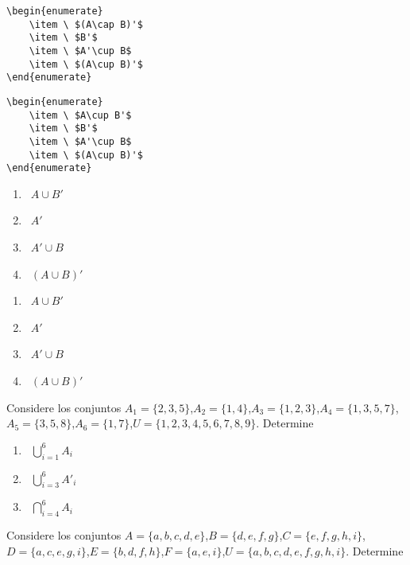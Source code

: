 \documentclass[]{book}
\theoremstyle{definition}
\theoremstyle{definition}
\theoremstyle{definition}
\theoremstyle{remark}
\begin{document}
\begin{verbatim}
\begin{enumerate}
	\item \ $(A\cap B)'$
	\item \ $B'$
	\item \ $A'\cup B$
	\item \ $(A\cup B)'$
\end{enumerate}
\end{verbatim}

\begin{verbatim}
\begin{enumerate}
	\item \ $A\cup B'$
	\item \ $B'$
	\item \ $A'\cup B$
	\item \ $(A\cup B)'$
\end{enumerate}
\end{verbatim}

\begin{enumerate}
	\item \ $A\cup B'$
	\item \ $A'$
	\item \ $A'\cup B$
	\item \ $(A\cup B)'$
\end{enumerate}

\begin{enumerate}
	\item \ $A\cup B'$
	\item \ $A'$
	\item \ $A'\cup B$
	\item \ $(A\cup B)'$
\end{enumerate}

Considere los conjuntos \(A_{1}=\{2,3,5\}\),\(A_{2}=\{1,4\}\),\(A_{3}=\{1,2,3\}\),\(A_{4}=\{1,3,5,7\}\),\(A_{5}=\{3,5,8\}\),\(A_{6}=\{1,7\}\),\(U=\{1,2,3,4,5,6,7,8,9\}\). Determine

\begin{enumerate}
	\item \ $\bigcup_{i=1}^{6}A_{i}$
	\item \ $\bigcup_{i=3}^{6}A'_{i}$
	\item \ $\bigcap_{i=4}^{6}A_{i}$
\end{enumerate}

Considere los conjuntos \(A=\{a,b,c,d,e\}\),\(B=\{d,e,f,g\}\),\(C=\{e,f,g,h,i\}\),\(D=\{a,c,e,g,i\}\),\break \(E=\{b,d,f,h\}\),\(F=\{a,e,i\}\),\break \(U=\{a,b,c,d,e,f,g,h,i\}\). Determine
\end{document}
